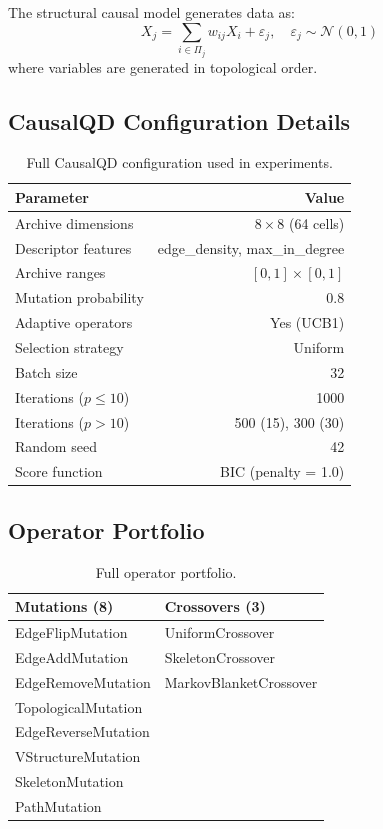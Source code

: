 \documentclass[11pt,a4paper]{article}
\begin{document}
The structural causal model generates data as:
\begin{equation}
    X_j = \sum_{i \in \Pi_j} w_{ij} X_i + \varepsilon_j, \quad \varepsilon_j \sim \mathcal{N}(0, 1)
\end{equation}
where variables are generated in topological order.

\subsection{CausalQD Configuration Details}

\begin{table}[h]
\centering
\caption{Full CausalQD configuration used in experiments.}
\begin{tabular}{@{}lr@{}}
\toprule
\textbf{Parameter} & \textbf{Value} \\
\midrule
Archive dimensions & $8 \times 8$ (64 cells) \\
Descriptor features & edge\_density, max\_in\_degree \\
Archive ranges & $[0, 1] \times [0, 1]$ \\
Mutation probability & 0.8 \\
Adaptive operators & Yes (UCB1) \\
Selection strategy & Uniform \\
Batch size & 32 \\
Iterations ($p \leq 10$) & 1000 \\
Iterations ($p > 10$) & 500 (15), 300 (30) \\
Random seed & 42 \\
Score function & BIC (penalty = 1.0) \\
\bottomrule
\end{tabular}
\end{table}

\subsection{Operator Portfolio}

\begin{table}[h]
\centering
\caption{Full operator portfolio.}
\begin{tabular}{@{}ll@{}}
\toprule
\textbf{Mutations (8)} & \textbf{Crossovers (3)} \\
\midrule
EdgeFlipMutation & UniformCrossover \\
EdgeAddMutation & SkeletonCrossover \\
EdgeRemoveMutation & MarkovBlanketCrossover \\
TopologicalMutation & \\
EdgeReverseMutation & \\
VStructureMutation & \\
SkeletonMutation & \\
PathMutation & \\
\bottomrule
\end{tabular}
\end{table}
\end{document}
